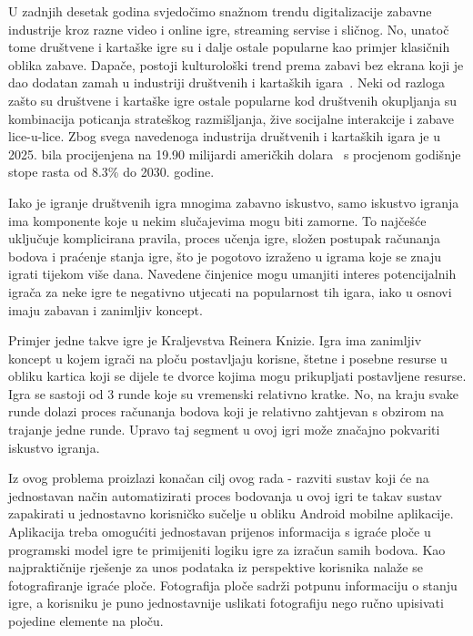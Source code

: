 \documentclass[diplomskirad]{fer}
\begin{document}
	U zadnjih desetak godina svjedočimo snažnom trendu digitalizacije zabavne industrije kroz razne video i online igre, streaming servise i sličnog. No, unatoč tome društvene i kartaške igre su i dalje ostale popularne kao primjer klasičnih oblika zabave. Dapače, postoji kulturološki trend prema zabavi bez ekrana koji je dao dodatan zamah u industriji društvenih i kartaških igara~\cite{BoardGamesPopularityReport2025}. Neki od razloga zašto su društvene i kartaške igre ostale popularne kod društvenih okupljanja su kombinacija poticanja strateškog razmišljanja, žive socijalne interakcije i zabave lice-u-lice\cite{BoardGamesPopularityReport2025}. Zbog svega navedenoga industrija društvenih i kartaških igara je u 2025. bila procijenjena na 19.90 milijardi američkih dolara~\cite{BoardGamesPopularityReport2025} s procjenom godišnje stope rasta od 8.3\% do 2030. godine.
	
	Iako je igranje društvenih igra mnogima zabavno iskustvo, samo iskustvo igranja ima komponente koje u nekim slučajevima mogu biti zamorne. To najčešće uključuje komplicirana pravila, proces učenja igre, složen postupak računanja bodova i praćenje stanja igre, što je pogotovo izraženo u igrama koje se znaju igrati tijekom više dana. Navedene činjenice mogu umanjiti interes potencijalnih igrača za neke igre te negativno utjecati na popularnost tih igara, iako u osnovi imaju zabavan i zanimljiv koncept.
	
	Primjer jedne takve igre je Kraljevstva Reinera Knizie. Igra ima zanimljiv koncept u kojem igrači na ploču postavljaju korisne, štetne i posebne resurse u obliku kartica koji se dijele te dvorce kojima mogu prikupljati postavljene resurse. Igra se sastoji od 3 runde koje su vremenski relativno kratke. No, na kraju svake runde dolazi proces računanja bodova koji je relativno zahtjevan s obzirom na trajanje jedne runde. Upravo taj segment u ovoj igri može značajno pokvariti iskustvo igranja.
	
	Iz ovog problema proizlazi konačan cilj ovog rada - razviti sustav koji će na jednostavan način automatizirati proces bodovanja u ovoj igri te takav sustav zapakirati u jednostavno korisničko sučelje u obliku Android mobilne aplikacije. Aplikacija treba omogućiti jednostavan prijenos informacija s igraće ploče u programski model igre te primijeniti logiku igre za izračun samih bodova. Kao najpraktičnije rješenje za unos podataka iz perspektive korisnika nalaže se fotografiranje igraće ploče. Fotografija ploče sadrži potpunu informaciju o stanju igre, a korisniku je puno jednostavnije uslikati fotografiju nego ručno upisivati pojedine elemente na ploču.
	
\end{document}
